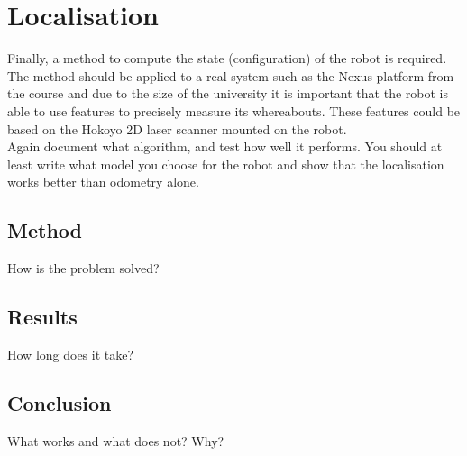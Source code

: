 \section{Localisation}
\label{sec::localisation}
Finally, a method to compute the state (configuration) of the robot is required. The method should be applied to a real system such as the Nexus platform from the course and due to the size of the university it is important that the robot is able to use features to precisely measure its whereabouts. These features could be based on the Hokoyo 2D laser scanner mounted on the robot.\\[0.2cm]
Again document what algorithm, and test how well it performs. You should at least write what model you choose for the robot and show that the localisation works better than odometry alone.

\subsection{Method}
How is the problem solved? 

\subsection{Results}
How long does it take?

\subsection{Conclusion}
What works and what does not? Why?

